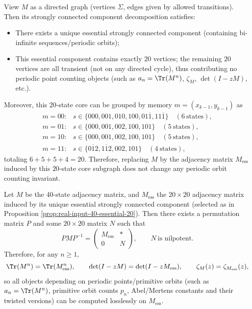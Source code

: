 \begin{proposition}\label{prop:real-input-40-essential-20}
View $M$ as a directed graph (vertices $\Sigma$, edges given by allowed transitions). Then its strongly connected component decomposition satisfies:
\begin{itemize}
  \item There exists a unique essential strongly connected component (containing bi-infinite sequences/periodic orbits);
  \item This essential component contains exactly $20$ vertices; the remaining $20$ vertices are all transient (not on any directed cycle), thus contributing no periodic point counting objects (such as $a_n=\Tr(M^n)$, $\zeta_M$, $\det(I-zM)$, etc.).
\end{itemize}
Moreover, this $20$-state core can be grouped by memory $m=(x_{k-1},y_{k-1})$ as
\[
\begin{array}{ll}
m=00:& s\in\{000,001,010,100,01\overline{1},11\overline{1}\}\quad(6\ \text{states}),\\
m=01:& s\in\{000,001,002,100,101\}\quad(5\ \text{states}),\\
m=10:& s\in\{000,001,002,100,101\}\quad(5\ \text{states}),\\
m=11:& s\in\{0\overline{1}2,1\overline{1}2,002,101\}\quad(4\ \text{states}),
\end{array}
\]
totaling $6+5+5+4=20$. Therefore, replacing $M$ by the adjacency matrix $M_{\mathrm{ess}}$ induced by this $20$-state core subgraph does not change any periodic orbit counting invariant.
\end{proposition}

\begin{proposition}\label{prop:real-input-40-essential-reduction}
Let $M$ be the 40-state adjacency matrix, and $M_{\mathrm{ess}}$ the $20\times 20$ adjacency matrix induced by its unique essential strongly connected component (selected as in Proposition \ref{prop:real-input-40-essential-20}). Then there exists a permutation matrix $P$ and some $20\times 20$ matrix $N$ such that
\[
PMP^{-1}=
\begin{pmatrix}
M_{\mathrm{ess}} & *\\
0 & N
\end{pmatrix},
\qquad
N\ \text{is nilpotent}.
\]
Therefore, for any $n\ge 1$,
\[
\Tr(M^n)=\Tr(M_{\mathrm{ess}}^n),
\qquad
\det(I-zM)=\det(I-zM_{\mathrm{ess}}),
\qquad
\zeta_M(z)=\zeta_{M_{\mathrm{ess}}}(z),
\]
so all objects depending on periodic points/primitive orbits (such as $a_n=\Tr(M^n)$, primitive orbit counts $p_n$, Abel/Mertens constants and their twisted versions) can be computed losslessly on $M_{\mathrm{ess}}$.
\end{proposition}


